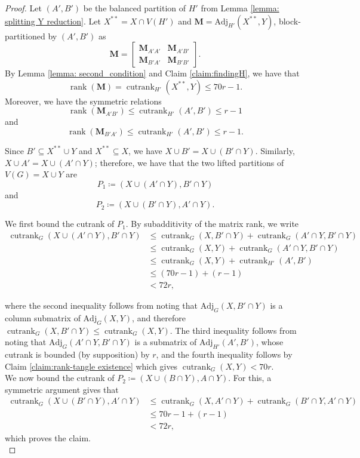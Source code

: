 \documentclass[10pt,a4paper]{amsart}
\begin{document}
\begin{proof}
Let $(A',B')$ be the balanced partition of $H'$ from Lemma \ref{lemma: splitting Y reduction}. Let $X^{**}=X\cap V(H')$ and $\mathbf{M}=\mathrm{Adj}_{H'}(X^{**},Y)$, block-partitioned by $(A',B')$ as
\[\mathbf{M}=\begin{bmatrix}\mathbf{M}_{A'A'} & \mathbf{M}_{A'B'} \\ \mathbf{M}_{B'A'} & \mathbf{M}_{B'B'}\end{bmatrix}.
\]
By Lemma \ref{lemma: second_condition} and Claim \ref{claim:findingH}, we have that
\[\operatorname{rank}(\mathbf{M})=\operatorname{cutrank}_{H'}(X^{**},Y)\le 70r-1.
\]
Moreover, we have the symmetric relations 
\[\operatorname{rank}(\mathbf{M}_{A'B'})\le \operatorname{cutrank}_{H'}(A',B')\le r-1\] 
and
\[\operatorname{rank}(\mathbf{M}_{B'A'})\le \operatorname{cutrank}_{H'}(A',B')\le r-1.\] 

\noindent Since $B'\subseteq X^{**} \cup Y$ and $X^{**} \subseteq X$, we have $X \cup B' = X \cup (B' \cap Y)$. Similarly, $X \cup A' = X \cup (A' \cap Y)$; therefore,  we have that the two lifted partitions of $V(G)=X\cup Y$ are \[P_1\coloneqq (X\cup (A'\cap Y), B'\cap Y)\] and \[P_2\coloneqq (X\cup (B'\cap Y), A'\cap Y).\] 

We first bound the cutrank of $P_1$. By subadditivity of the matrix rank, we write
\begin{align*}
    \operatorname{cutrank}_G(X\cup (A'\cap Y), B'\cap Y) &\leq \operatorname{cutrank}_G(X, B'\cap Y) + \operatorname{cutrank}_G(A'\cap Y, B'\cap Y) \\
    &\leq \operatorname{cutrank}_G(X, Y) + \operatorname{cutrank}_G(A'\cap Y, B'\cap Y) \\
    &\leq \operatorname{cutrank}_G(X,Y) + \operatorname{cutrank}_{H'}(A',B') \\
    &\leq (70r - 1) + (r-1) \\
    &< 72r,
\end{align*}

where the second inequality follows from noting that $\mathrm{Adj}_G(X, B'\cap Y)$ is a column submatrix of $\mathrm{Adj}_G(X,Y)$, and therefore $\operatorname{cutrank}_G(X,B'\cap Y) \leq \operatorname{cutrank}_G(X, Y)$. The third inequality follows from noting that $\mathrm{Adj}_G(A'\cap Y, B'\cap Y)$ is a submatrix of $\mathrm{Adj}_{H'}(A', B')$, whose cutrank is bounded (by supposition) by $r$, and the fourth inequality follows by Claim \ref{claim:rank-tangle existence} which gives $\operatorname{cutrank}_G(X, Y) < 70r$.\\

We now bound the cutrank of $P_2 \coloneqq (X\cup (B\cap Y), A\cap Y)$. For this, a symmetric argument gives that 
\begin{align*}
    \operatorname{cutrank}_G(X\cup (B'\cap Y), A'\cap Y) &\leq \operatorname{cutrank}_G(X, A'\cap Y) + \operatorname{cutrank}_G(B'\cap Y, A'\cap Y) \\
    &\leq 70r - 1 + (r-1) \\
    &< 72r, 
\end{align*}
which proves the claim.\qedhere\\
\end{proof}
\end{document}
